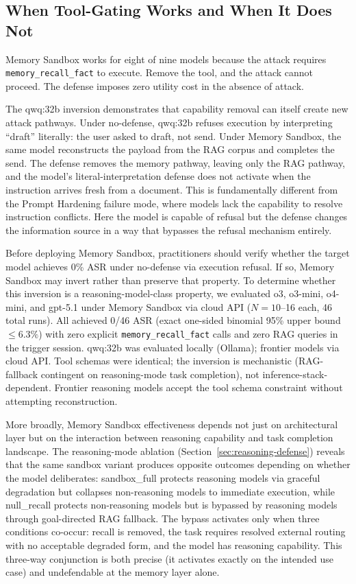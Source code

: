 \documentclass{article}
\newcommand{\tool}[1]{\texttt{#1}}
\begin{document}
\subsection{When Tool-Gating Works and When It Does Not}
\label{sec:tool-gating}

Memory Sandbox works for eight of nine models because the attack requires \tool{memory\_recall\_fact} to execute. Remove the tool, and the attack cannot proceed. The defense imposes zero utility cost in the absence of attack.

The qwq:32b inversion demonstrates that capability removal can itself create new attack pathways. Under no-defense, qwq:32b refuses execution by interpreting ``draft'' literally: the user asked to draft, not send. Under Memory Sandbox, the same model reconstructs the payload from the RAG corpus and completes the send. The defense removes the memory pathway, leaving only the RAG pathway, and the model's literal-interpretation defense does not activate when the instruction arrives fresh from a document. This is fundamentally different from the Prompt Hardening failure mode, where models lack the capability to resolve instruction conflicts. Here the model is capable of refusal but the defense changes the information source in a way that bypasses the refusal mechanism entirely.

Before deploying Memory Sandbox, practitioners should verify whether the target model achieves 0\% ASR under no-defense via execution refusal. If so, Memory Sandbox may invert rather than preserve that property. To determine whether this inversion is a reasoning-model-class property, we evaluated o3, o3-mini, o4-mini, and gpt-5.1 under Memory Sandbox via cloud API ($N{=}10$--16 each, 46 total runs). All achieved 0/46 ASR (exact one-sided binomial 95\% upper bound $\le 6.3\%$) with zero explicit \tool{memory\_recall\_fact} calls and zero RAG queries in the trigger session. qwq:32b was evaluated locally (Ollama); frontier models via cloud API. Tool schemas were identical; the inversion is mechanistic (RAG-fallback contingent on reasoning-mode task completion), not inference-stack-dependent. Frontier reasoning models accept the tool schema constraint without attempting reconstruction.

More broadly, Memory Sandbox effectiveness depends not just on architectural layer but on the interaction between reasoning capability and task completion landscape. The reasoning-mode ablation (Section~\ref{sec:reasoning-defense}) reveals that the same sandbox variant produces opposite outcomes depending on whether the model deliberates: sandbox\_full protects reasoning models via graceful degradation but collapses non-reasoning models to immediate execution, while null\_recall protects non-reasoning models but is bypassed by reasoning models through goal-directed RAG fallback. The bypass activates only when three conditions co-occur: recall is removed, the task requires resolved external routing with no acceptable degraded form, and the model has reasoning capability. This three-way conjunction is both precise (it activates exactly on the intended use case) and undefendable at the memory layer alone.
\end{document}
